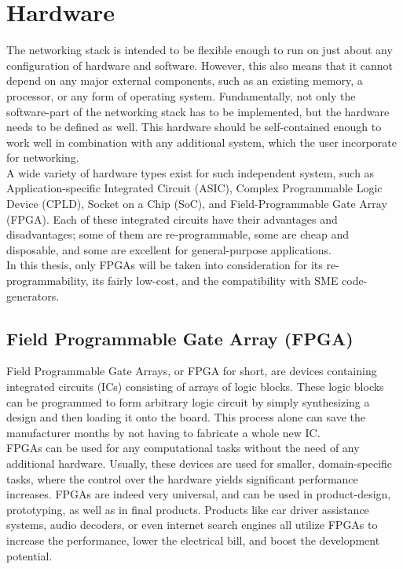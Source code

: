 \section{Hardware}
The networking stack is intended to be flexible enough to run on just about any 
configuration of hardware and software. However, this also means that it cannot 
depend on any major external components, such as an existing memory, a processor,
or any form of operating system. Fundamentally, not only the software-part of the
networking stack has to be implemented, but the hardware needs to be defined 
as well. This hardware should be self-contained enough to work well in combination 
with any additional system, which the user incorporate for networking.\\
A wide variety of hardware types exist for such independent system, such as 
Application-specific Integrated Circuit (ASIC), Complex Programmable Logic 
Device (CPLD), Socket on a Chip (SoC), and Field-Programmable Gate Array (FPGA).
Each of these integrated circuits have their advantages and disadvantages; some
of them are re-programmable, some are cheap and disposable, and some are excellent 
for general-purpose applications.\\
In this thesis, only FPGAs will be taken into consideration for its re-programmability,
its fairly low-cost, and the compatibility with SME code-generators.


\subsection{Field Programmable Gate Array (FPGA)}
Field Programmable Gate Arrays, or FPGA for short, are devices containing 
integrated circuits (ICs) consisting of arrays of logic blocks. 
These logic blocks can be programmed to form arbitrary logic circuit by simply 
synthesizing a design and then loading it onto the board. This process alone 
can save the manufacturer months by not having to fabricate a whole new IC. \\
FPGAs can be used for any computational tasks without the need of any additional
hardware. Usually, these devices are used for smaller, domain-specific tasks,
where the control over the hardware yields significant performance increases.
FPGAs are indeed very universal, and can be used in product-design, prototyping, 
as well as in final products. Products like car driver assistance 
systems\cite{xilinx_fpga_automotive}, audio decoders\cite{xilinx_fpga_audio}, 
or even internet search engines\cite{bing_search_fpga}  all utilize FPGAs to 
increase the performance, lower the electrical bill, and  boost the development 
potential. 



